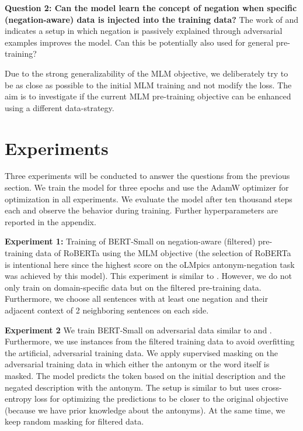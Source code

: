 \documentclass{article}
\begin{document}
\textbf{Question 2: Can the model learn the concept of negation when specific (negation-aware) data is injected into the training data?}\label{question2}
The work of \cite{kassner-schutze-2020-negated} and \cite{hosseini-etal-2021-understanding} indicates a setup in which negation is passively explained through adversarial examples improves the model. Can this be potentially also used for general pre-training?

Due to the strong generalizability of the MLM objective, we deliberately try to be as close as possible to the initial MLM training and not modify the loss. The aim is to investigate if the current MLM pre-training objective can be enhanced using a different data-strategy.


\section{Experiments}
\label{section::experiments}

Three experiments will be conducted to answer the questions from the previous section. We train the model for three epochs and use the AdamW optimizer \citep{loshchilov2019decoupled} for optimization in all experiments. We evaluate the model after ten thousand steps each and observe the behavior during training. Further hyperparameters are reported in the appendix.

\textbf{Experiment 1:}
Training of BERT-Small on negation-aware (filtered) pre-training data of RoBERTa using the MLM objective (the selection of RoBERTa is intentional here since the highest score on the oLMpics antonym-negation task was achieved by this model). This experiment is similar to \cite{TruongImprovingNegation2022}. However, we do not only train on domain-specific data but on the filtered pre-training data. Furthermore, we choose all sentences with at least one negation and their adjacent context of 2 neighboring sentences on each side.

\textbf{Experiment 2}
We train BERT-Small on adversarial data similar to \cite{hosseini-etal-2021-understanding} and \cite{kassner-schutze-2020-negated}. Furthermore, we use instances from the filtered training data to avoid overfitting the artificial, adversarial training data. We apply supervised masking on the adversarial training data in which either the antonym or the word itself is masked. The model predicts the token based on the initial description and the negated description with the antonym. The setup is similar to \cite{hosseini-etal-2021-understanding} but uses cross-entropy loss for optimizing the predictions to be closer to the original objective (because we have prior knowledge about the antonyms). At the same time, we keep random masking for filtered data.
\end{document}
